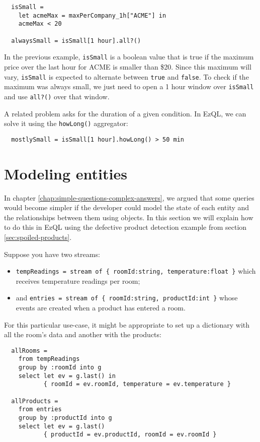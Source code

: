 \documentclass[a4,11pt]{report}
\begin{document}
\begin{lstlisting}
  isSmall =
    let acmeMax = maxPerCompany_1h["ACME"] in
    acmeMax < 20

  alwaysSmall = isSmall[1 hour].all?()
\end{lstlisting}

In the previous example, \verb=isSmall= is a boolean value that is
true if the maximum price over the last hour for ACME is smaller than
\$20. Since this maximum will vary, \verb=isSmall= is expected to
alternate between \verb=true= and \verb=false=. To check if the
maximum was always small, we just need to open a 1 hour window over
\verb=isSmall= and use \verb=all?()= over that window.

A related problem asks for the duration of a given condition. In EzQL,
we can solve it using the \verb=howLong()= aggregator:

\begin{lstlisting}
  mostlySmall = isSmall[1 hour].howLong() > 50 min
\end{lstlisting}

\section{Modeling entities}

\label{sec:entities}

In chapter \ref{chap:simple-questions-complex-answers}, we argued that
some queries would become simpler if the developer could model the
state of each entity and the relationships between them using
objects. In this section we will explain how to do this in EzQL using
the defective product detection example from section
\ref{sec:spoiled-products}.

Suppose you have two streams:

\begin{itemize}
\item \verb!tempReadings = stream of { roomId:string, temperature:float }! which receives
  temperature readings per room;
\item and \verb!entries = stream of { roomId:string, productId:int }! whose events are
  created when a product has entered a room.
\end{itemize}

For this particular use-case, it might be appropriate to set up a
dictionary with all the room's data and another with the products:

\begin{lstlisting}
  allRooms =
    from tempReadings
    group by :roomId into g
    select let ev = g.last() in
           { roomId = ev.roomId, temperature = ev.temperature }

  allProducts =
    from entries
    group by :productId into g
    select let ev = g.last()
           { productId = ev.productId, roomId = ev.roomId }
\end{lstlisting}
\end{document}
